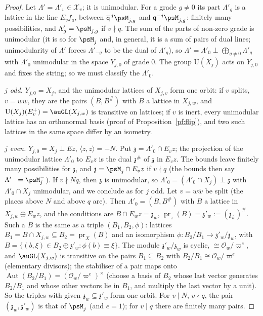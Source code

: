 \documentclass[10pt]{amsart}
\theoremstyle{definition}
\theoremstyle{remark}
\providecommand{\auO}{\mathcal O}
\providecommand{\auU}{\mathrm U}
\providecommand{\aubar}[1]{\overline{#1}}
\begin{document}
\begin{proof}
Let $\Lambda'=\Lambda'_v\in\mathcal X_v$; it is unimodular. For a grade $g\ne0$ its part
$\Lambda'_g$ is a lattice in the line $E_vf_a$, between $\aubar{\mathsf q}^{\,j}\psM_{j,g}$ and
$\mathsf q^{-j}\psM_{j,g}$: finitely many possibilities, and $\Lambda'_g=\psM_{j,g}$ if $v\nmid q$.
The sum of the parts of non-zero grade is unimodular (it is so for $\psM_j$ and, in general, it is
a sum of pairs of dual lines; unimodularity of $\Lambda'$ forces $\Lambda'_{-g}$ to be the dual of
$\Lambda'_g$), so $\Lambda'=\Lambda'_0\perp\bigoplus_{g\ne0}\Lambda'_g$ with $\Lambda'_0$
unimodular in the space $Y_{j,0}$ of grade $0$. The group $\auU(X_j)$ acts on $Y_{j,0}$ and fixes
the string; so we must classify the $\Lambda'_0$.

\emph{$j$ odd.} $Y_{j,0}=X_j$, and the unimodular lattices of $X_{j,v}$ form one orbit: if $v$
splits, $v=w\aubar w$, they are the pairs $(B,B^\#)$ with $B$ a lattice in $X_{j,w}$, and
$\auU(X_j)(E^+_v)=\auGL(X_{j,w})$ is transitive on lattices; if $v$ is inert, every unimodular
lattice has an orthonormal basis (proof of Proposition~\ref{pf:flip}), and two such lattices in
the same space differ by an isometry.

\emph{$j$ even.} $Y_{j,0}=X_j\perp E z$, $\langle z,z\rangle=-N$. Put $\mathfrak z=\Lambda'_0\cap
E_vz$; the projection of the unimodular lattice $\Lambda'_0$ to $E_vz$ is the dual $\mathfrak
z^\#$ of $\mathfrak z$ in $E_vz$. The bounds leave finitely many possibilities for $\mathfrak z$,
and $\mathfrak z=\psM_j\cap E_vz$ if $v\nmid q$ (the bounds then say $\Lambda'^-=\psM_j^-$). If $v\nmid Nq$, then $\mathfrak z$ is unimodular, so
$\Lambda'_0=(\Lambda'_0\cap X_j)\perp\mathfrak z$ with $\Lambda'_0\cap X_j$ unimodular, and we
conclude as for $j$ odd. Let $v=w\aubar w$ be split (the places above $N$ and above $q$ are). Then
$\Lambda'_0=(B,B^\#)$ with $B$ a lattice in $X_{j,w}\oplus E_wz$, and the conditions are $B\cap
E_wz=\mathfrak z_w$, $\operatorname{pr}_z(B)=\mathfrak z'_w:=(\mathfrak z_{\bar w})^\#$. Such a
$B$ is the same as a triple $(B_1,B_2,\phi)$: lattices $B_1=B\cap X_{j,w}\subseteq B_2=
\operatorname{pr}_X(B)$ and an isomorphism $\phi\colon B_2/B_1\to\mathfrak z'_w/\mathfrak z_w$, with
$B=\{(b,\xi)\in B_2\oplus\mathfrak z'_w:\phi(b)\equiv\xi\}$. The module $\mathfrak z'_w/\mathfrak
z_w$ is cyclic, $\cong\auO_w/\varpi^e$, and $\auGL(X_{j,w})$ is transitive on the pairs
$B_1\subseteq B_2$ with $B_2/B_1\cong\auO_w/\varpi^e$ (elementary divisors); the stabiliser of a
pair maps onto $\operatorname{Aut}(B_2/B_1)=(\auO_w/\varpi^e)^\times$ (choose a basis of $B_2$ whose
last vector generates $B_2/B_1$ and whose other vectors lie in $B_1$, and multiply the last vector
by a unit). So the triples with given $\mathfrak z_w\subseteq\mathfrak z'_w$ form one orbit. For
$v\mid N$, $v\nmid q$, the pair $(\mathfrak z_w,\mathfrak z'_w)$ is that of $\psM_j$ (and $e=1$);
for $v\mid q$ there are finitely many pairs.


\end{proof}
\end{document}
